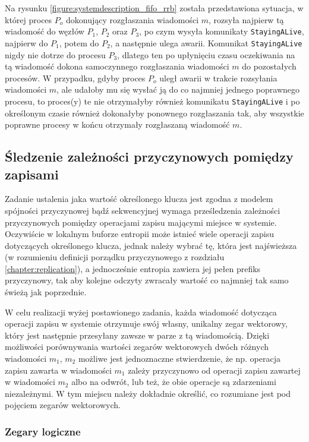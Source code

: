 Na rysunku \ref{figure:systemdescription_fifo_rrb} została przedstawiona sytuacja, w której proces $ P_o $ dokonujący rozgłaszania wiadomości $ m $, rozsyła najpierw tą wiadomość do węzłów $ P_1 $, $ P_2 $ oraz $ P_3 $, po czym wysyła komunikaty \texttt{StayingALive}, najpierw do $ P_1 $, potem do $ P_2 $, a następnie ulega awarii. Komunikat \texttt{StayingALive} nigdy nie dotrze do procesu $ P_3 $, dlatego ten po upłynięciu czasu oczekiwania na tą wiadomość dokona samoczynnego rozgłaszania wiadomości $ m $ do pozostałych procesów. W przypadku, gdyby proces $ P_o $ uległ awarii w trakcie rozsyłania wiadomości $ m $, ale udałoby mu się wysłać ją do co najmniej jednego poprawnego procesu, to proces(y) te nie otrzymałyby również komunikatu \texttt{StayingALive} i po określonym czasie również dokonałyby ponownego rozgłaszania tak, aby wszystkie poprawne procesy w końcu otrzymały rozgłaszaną wiadomość $ m $.

\subsection{Śledzenie zależności przyczynowych pomiędzy zapisami}

Zadanie ustalenia jaka wartość określonego klucza jest zgodna z modelem spójności przyczynowej bądź sekwencyjnej wymaga prześledzenia zależności przyczynowych pomiędzy operacjami zapisu mającymi miejsce w systemie. Oczywiście w lokalnym buforze entropii może istnieć wiele operacji zapisu dotyczących określonego klucza, jednak należy wybrać tę, która jest najświeższa (w rozumieniu definicji porządku przyczynowego z rozdziału \ref{chapter:replication}), a jednocześnie entropia zawiera jej pełen prefiks przyczynowy, tak aby kolejne odczyty zwracały wartość co najmniej tak samo świeżą jak poprzednie.

W celu realizacji wyżej postawionego zadania, każda wiadomość dotycząca operacji zapisu w systemie otrzymuje swój własny, unikalny zegar wektorowy, który jest następnie przesyłany zawsze w parze z tą wiadomością. Dzięki możliwości porównywania wartości zegarów wektorowych dwóch różnych wiadomości $ m_1 $, $ m_2 $ możliwe jest jednoznaczne stwierdzenie, że np. operacja zapisu zawarta w wiadomości $ m_1 $ zależy przyczynowo od operacji zapisu zawartej w wiadomości $ m_2 $ albo na odwrót, lub też, że obie operacje są zdarzeniami niezależnymi. W tym miejscu należy dokładnie określić, co rozumiane jest pod pojęciem zegarów wektorowych.

\subsubsection{Zegary logiczne}

